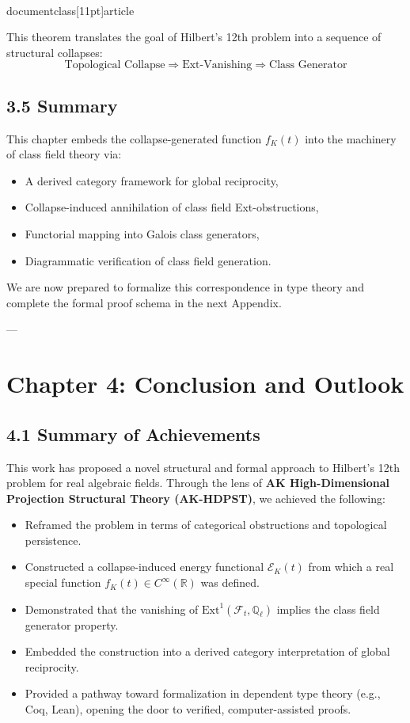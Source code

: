 \\documentclass[11pt]{article}
\begin{document}
This theorem translates the goal of Hilbert’s 12th problem into a sequence of structural collapses:
\[
\text{Topological Collapse} \Rightarrow \text{Ext-Vanishing} \Rightarrow \text{Class Generator}
\]

\subsection*{3.5 Summary}

This chapter embeds the collapse-generated function \( f_K(t) \) into the machinery of class field theory via:
\begin{itemize}
    \item A derived category framework for global reciprocity,
    \item Collapse-induced annihilation of class field Ext-obstructions,
    \item Functorial mapping into Galois class generators,
    \item Diagrammatic verification of class field generation.
\end{itemize}

We are now prepared to formalize this correspondence in type theory and complete the formal proof schema in the next Appendix.


---


\section*{Chapter 4: Conclusion and Outlook}

\subsection*{4.1 Summary of Achievements}

This work has proposed a novel structural and formal approach to Hilbert’s 12th problem for real algebraic fields.  
Through the lens of \textbf{AK High-Dimensional Projection Structural Theory (AK-HDPST)}, we achieved the following:

\begin{itemize}
    \item Reframed the problem in terms of categorical obstructions and topological persistence.
    \item Constructed a collapse-induced energy functional \( \mathcal{E}_K(t) \) from which a real special function \( f_K(t) \in C^\infty(\mathbb{R}) \) was defined.
    \item Demonstrated that the vanishing of \( \mathrm{Ext}^1(\mathcal{F}_t, \mathbb{Q}_\ell) \) implies the class field generator property.
    \item Embedded the construction into a derived category interpretation of global reciprocity.
    \item Provided a pathway toward formalization in dependent type theory (e.g., Coq, Lean), opening the door to verified, computer-assisted proofs.
\end{itemize}
\end{document}

